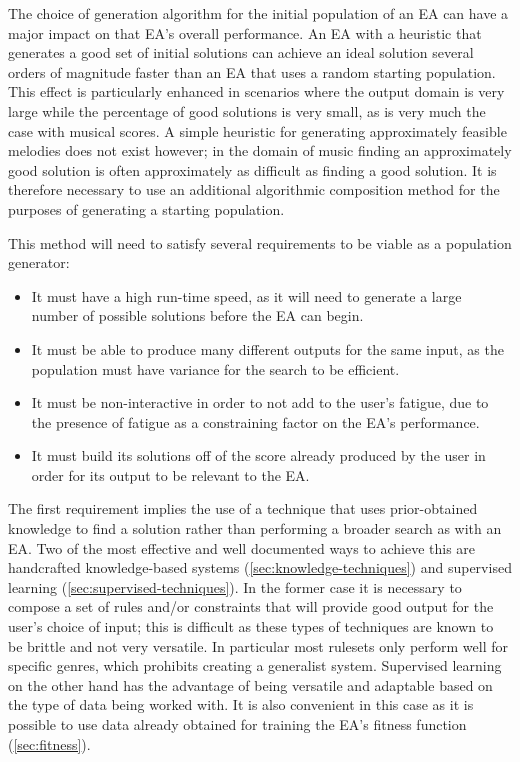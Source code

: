 \documentclass[ author={Stephen Livermore-Tozer},
				supervisor={Dr. Peter Flach},
				degree={MEng},
				title={Performing Algorithmic Co-composition Using Machine Learning},
				subtitle={},
				type={research},
				year={2016} ]{dissertation}
\begin{document}
	The choice of generation algorithm for the initial population of an EA can have a major impact on that EA's overall performance. An EA with a heuristic that generates a good set of initial solutions can achieve an ideal solution several orders of magnitude faster than an EA that uses a random starting population. This effect is particularly enhanced in scenarios where the output domain is very large while the percentage of good solutions is very small, as is very much the case with musical scores. A simple heuristic for generating approximately feasible melodies does not exist however; in the domain of music finding an approximately good solution is often approximately as difficult as finding a good solution. It is therefore necessary to use an additional algorithmic composition method for the purposes of generating a starting population.
	
	This method will need to satisfy several requirements to be viable as a population generator:
	
	\begin{itemize}
		\item It must have a high run-time speed, as it will need to generate a large number of possible solutions before the EA can begin.
		\item It must be able to produce many different outputs for the same input, as the population must have variance for the search to be efficient.
		\item It must be non-interactive in order to not add to the user's fatigue, due to the presence of fatigue as a constraining factor on the EA's performance.
		\item It must build its solutions off of the score already produced by the user in order for its output to be relevant to the EA.
	\end{itemize}
	
	The first requirement implies the use of a technique that uses prior-obtained knowledge to find a solution rather than performing a broader search as with an EA. Two of the most effective and well documented ways to achieve this are handcrafted knowledge-based systems (\ref{sec:knowledge-techniques}) and supervised learning (\ref{sec:supervised-techniques}). In the former case it is necessary to compose a set of rules and/or constraints that will provide good output for the user's choice of input; this is difficult as these types of techniques are known to be brittle and not very versatile.	In particular most rulesets only perform well for specific genres, which prohibits creating a generalist system. Supervised learning on the other hand has the advantage of being versatile and adaptable based on the type of data being worked with. It is also convenient in this case as it is possible to use data already obtained for training the EA's fitness function (\ref{sec:fitness}).
	
\end{document}
